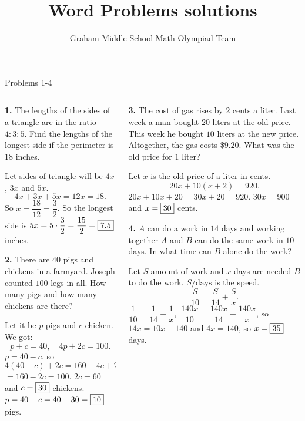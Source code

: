 \documentclass[9pt,aspectratio=169]{beamer}
\title{Word Problems solutions}
\subtitle[Graham Middle School]{Graham Middle School Math Olympiad Team}
\begin{document}
\maketitle

\begin{frame}{Problems 1-4}
  \begin{columns}[T]
    \begin{column}{0.5\textwidth}
      \begin{problem}
        \textbf{1.} The lengths of the sides of a triangle are in the ratio $4:3:5$. Find the lengths of the longest side if the perimeter is $18$ inches.
      \end{problem}
      Let sides of triangle will be $4x$, $3x$ and $5x$.
      \[ 4x + 3x + 5x = 12x = 18. \]
      So $x = \dfrac{18}{12} = \dfrac{3}{2}$. So the longest side is $5x = 5 \cdot \dfrac{3}{2} = \dfrac{15}{2} = \fbox{7{.}5}$ inches.
      \begin{problem}
        \textbf{2.} There are $40$ pigs and chickens in a farmyard. Joseph counted $100$ legs in all. How many pigs and how many chickens are there?
      \end{problem}
      Let it be $p$ pigs and $c$ chicken. We got:
      \[
        p + c = 40,\quad 4p + 2c = 100.
      \]
      $p = 40 - c$, so $4(40-c) + 2c = 160 - 4c + 2c =$ $=160 - 2c = 100$. $2c = 60$ and $c = \fbox{30}$ chickens.
      $p = 40 - c = 40-30 = \fbox{10}$ pigs.
    \end{column}
    \begin{column}{0.5\textwidth}
      \begin{problem}
        \textbf{3.} The cost of gas rises by $2$ cents a liter. Last week a man bought $20$ liters at the old price. This week he bought $10$ liters at the new price. Altogether, the gas costs \$$9{.}20$. What was the old price for $1$ liter?
      \end{problem}
      Let $x$ is the old price of a liter in cents.
      \[ 20 x + 10 (x + 2) = 920. \]
      $20x + 10x + 20 = 30x + 20 = 920$. $30x = 900$ and $x = \fbox{30}$ cents. 
      \begin{problem}
        \textbf{4.} $A$ can do a work in $14$ days and working together $A$ and $B$ can do the same work in $10$ days. In what time can $B$ alone do the work?
      \end{problem}
      Let $S$ amount of work and $x$ days are needed $B$ to do the work. $S/\text{days}$ is the speed.
      \[ \frac{S}{10} = \frac{S}{14} + \frac{S}{x}. \] 
      $\dfrac{1}{10} = \dfrac{1}{14} + \dfrac{1}{x},$ $\dfrac{140x}{10} = \dfrac{140x}{14} + \dfrac{140x}{x}$, so $14x = 10x + 140$ and $4x = 140$, so $x = \fbox{35}$ days.
    \end{column}
  \end{columns}
\end{frame}
\end{document}
